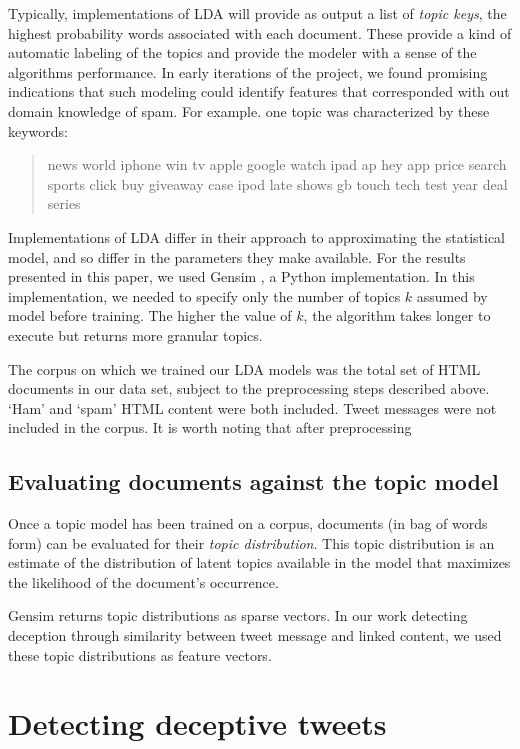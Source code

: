\documentclass[times, 11pt, twocolumn]{article}
\begin{document}
Typically, implementations of LDA will provide as output a list of \emph{topic keys}, the highest probability words associated with each document.
These provide a kind of automatic labeling of the topics and provide the modeler with a sense of the algorithms performance.
In early iterations of the project, we found promising indications that such modeling could identify features that corresponded with out domain knowledge of spam.
For example. one topic was characterized by these keywords:

\begin{quotation}
news world iphone win tv apple google watch ipad ap hey  app price search sports click buy giveaway case ipod late shows gb touch  tech test year deal series
\end{quotation} 

Implementations of LDA differ in their approach to approximating the statistical model, and so differ in the parameters they make available.
For the results presented in this paper, we used Gensim \cite{rehurek_lrec}, a Python implementation.
In this implementation, we needed to specify only the number of topics $k$ assumed by model before training.
The higher the value of $k$, the algorithm takes longer to execute but returns more granular topics.

The corpus on which we trained our LDA models was the total set of HTML documents in our data set, subject to the preprocessing steps described above.
`Ham' and `spam' HTML content were both included.
Tweet messages were not included in the corpus.
It is worth noting that after preprocessing 

\subsection{Evaluating documents against the topic model}

Once a topic model has been trained on a corpus, documents (in bag of words form) can
be evaluated for their \emph{topic distribution}.
This topic distribution is an estimate of the distribution of latent topics available in the model
that maximizes the likelihood of the document's occurrence.

Gensim returns topic distributions as sparse vectors.  In our work detecting deception through similarity
between tweet message and linked content, we used these topic distributions as feature vectors.

\section{Detecting deceptive tweets}
\end{document}
